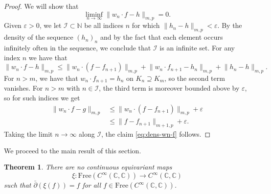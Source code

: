 \documentclass[12pt]{paper}
\numberwithin{equation}{section}
\theoremstyle{plain}
\newtheorem{theorem}{Theorem}[section]
\theoremstyle{definition}
\newcommand{\C}{\mathbb{C}}
\newcommand{\N}{\mathbb{N}}
\newcommand{\free}{\mathrm{Free}}
\renewcommand{\epsilon}{\varepsilon}
\begin{document}
\begin{proof}
  We will show that
  \begin{equation}
    \label{eq:dens-wn-f}
    \liminf_{n\to\infty}\lVert w_n\cdot f-h\rVert_{m,p}=0.
  \end{equation}
  Given \(\epsilon>0\), we let \(\mathcal{I}\subset\N\) be all indices \(n\) for which
  \(\lVert h_n-h\rVert_{m,p}<\epsilon\). By the density of the sequence \((h_n)_n\) and by the fact
  that each element occurs infinitely often in the sequence, we conclude that \(\mathcal{I}\) is an
  infinite set. For any index \(n\) we have that
  \[
    \lVert w_n\cdot f - h\rVert_{m,p}\le \lVert w_n\cdot (f-f_{n+1})\rVert_{m,p} + \lVert w_n\cdot
    f_{n+1} - h_{n}\rVert_{m,p} + \lVert h_n - h\rVert_{m,p}.
  \]
  For \(n>m\), we have that \(w_n\cdot f_{n+1}=h_n\) on \(K_n\supseteq K_m\), so the second term
  vanishes. For \(n>m\) with \(n\in \mathcal{I}\), the third term is moreover bounded above by
  \(\epsilon\), so for such indices we get
  \[
    \begin{aligned}
      \lVert w_n\cdot f - g\rVert_{m,p}&\le \lVert w_n\cdot (f-f_{n+1})\rVert_{m,p}+\epsilon \\
                                       & \le \lVert f-f_{n+1}\rVert_{m+1,p}+\epsilon.
    \end{aligned}
  \]
  Taking the limit \(n\to\infty\) along \(\mathcal{I}\), the claim \eqref{eq:dens-wn-f} follows.
\end{proof}

We proceed to the main result of this section.

\begin{theorem}
  \label{thm:no-dbar-inverse}
  There are no continuous equivariant maps
  \[\xi : \free(C^{\infty}(\C, \C)) \to C^{\infty}(\C, \C)\] such that
  \(\bar{\partial}(\xi(f)) = f\) for all \(f \in \free(C^{\infty}(\C, \C))\).
\end{theorem}
\end{document}
